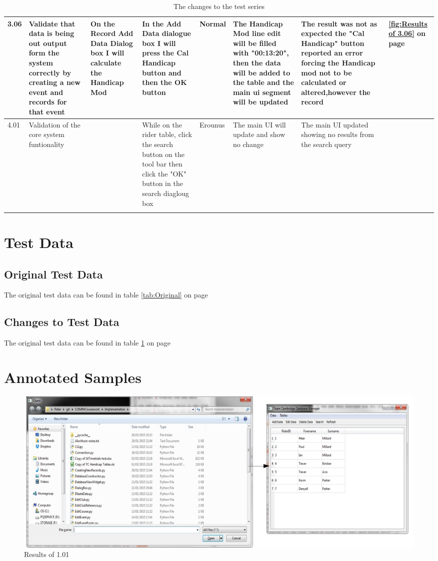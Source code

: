 \begin{landscape}
\begin{center}
\begin{longtable}{|p{1.5cm}|p{2.5cm}|p{2.5cm}|p{2cm}|p{2cm}|p{2cm}|p{2cm}|p{2cm}|}
        \rowcolor{LiteGrey} 3.06 & Validate that data is being out output form the system correctly by creating a new event and records for that event & On the Record Add Data Dialog box I will calculate the Handicap Mod & In the Add Data dialogue box I will press the Cal Handicap button and then the OK button & Normal & The Handicap Mod line edit will be filled with "00:13:20", then  the data will be added to the table and the main ui segment will be updated & The result was not as expected the "Cal Handicap" button reported an error forcing the Handicap mod not to be calculated or altered,however the record & \ref{fig:Results of 3.06} on page \pageref{fig:Results of 3.06}\\ \hline

\rowcolor{LiteGrey} 4.01 & Validation of the core system funtionality & & While on the rider table, click the search button on the tool bar then click the "OK" button in the search diagloug box & Erounus & The main UI will update and show no change & The main UI updated showing no results from the search query & \\\hline
        \caption{The changes to the test series}
        \label{tab:Changes} 
    \end{longtable}
\end{center}


\section{Test Data}

\subsection{Original Test Data}
The original test data can be found in table \ref{tab:Original} on page \pageref{tab:Original}

\subsection{Changes to Test Data}
The original test data can be found in table \ref{tab:Changes} on page\pageref{tab:Changes}

\section{Annotated Samples}
\begin{figure}[H]
    \includegraphics[width=\textwidth]{./Testing/S3/101.pdf}
    \caption{Results of 1.01} \label{fig:Results of 1.01}
\end{figure}


\end{landscape}
